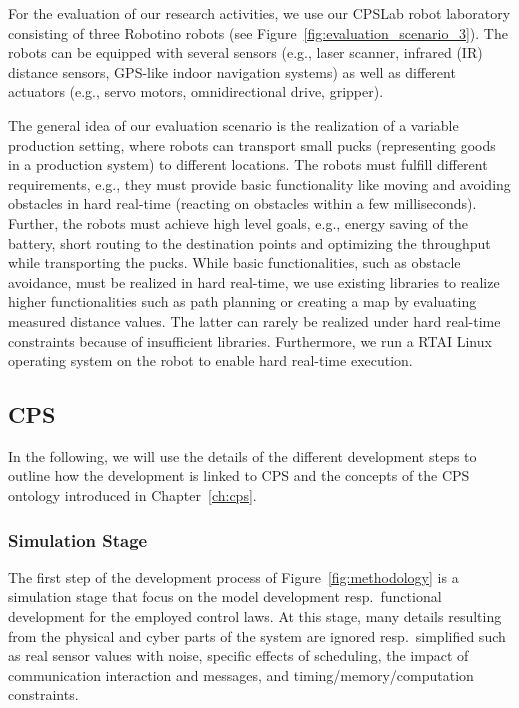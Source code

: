 For the evaluation of our research activities, we use our CPSLab robot laboratory consisting of three Robotino robots (see Figure~\ref{fig:evaluation_scenario_3}). The robots can be equipped with several sensors (e.g., laser scanner, infrared (IR) distance sensors, GPS-like indoor navigation systems) as well as different actuators (e.g., servo motors, omnidirectional drive, gripper). 

The general idea of our evaluation scenario is the realization of a variable production setting, where robots can transport small pucks (representing goods in a production system) to different locations. The robots must fulfill different requirements, e.g., they must provide basic functionality like moving and avoiding obstacles in hard real-time (reacting on obstacles within a few milliseconds). Further, the robots must achieve high level goals, e.g., energy saving of the battery, short routing to the destination points and optimizing the throughput while transporting the pucks. While basic functionalities, such as obstacle avoidance, must be realized in hard real-time, we use existing libraries to realize higher functionalities such as path planning or creating a map by evaluating measured distance values. The latter can rarely be realized under hard real-time constraints because of insufficient libraries. Furthermore, we run a RTAI Linux operating system on the robot to enable hard real-time execution.

\subsection{CPS}\label{subsec:cpslab-cps}

In the following, we will use the details of the different development steps to outline how the development is linked to CPS and the concepts of the CPS ontology introduced in Chapter~\ref{ch:cps}.

\subsubsection{Simulation Stage}
%
The first step of the development process of Figure~\ref{fig:methodology} is a simulation stage that focus on the model development resp.~functional development for the employed control laws.
%
At this stage, many details resulting from the physical and cyber parts of the system are ignored resp.~simplified such as real sensor values with noise, specific effects of scheduling, the impact of communication interaction and messages, and timing/memory/computation constraints.


